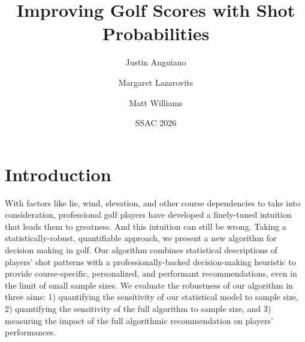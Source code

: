 \documentclass[11pt,a4paper]{article}
\title{Improving Golf Scores with Shot Probabilities}
\author[1]{Justin Anguiano}
\author[1]{Margaret Lazarovits}
\author[2]{Matt Williams}
\affil[1]{Department of Physics, University of Kansas}
\affil[2]{Noonan Caddie}
\date{SSAC 2026}
\begin{document}
\maketitle

\section{Introduction}
With factors like lie, wind, elevation, and other course dependencies to take into consideration, professional golf players have developed a finely-tuned intuition that leads them to greatness. And this intuition can still be wrong. Taking a statistically-robust, quantifiable approach, we present a new algorithm for decision making in golf. Our algorithm combines statistical descriptions of players’ shot patterns with a professionally-backed decision-making heuristic to provide course-specific, personalized, and performant recommendations, even in the limit of small sample sizes. We evaluate the robustness of our algorithm in three aims: 1) quantifying the sensitivity of our statistical model to sample size, 2) quantifying the sensitivity of the full algorithm to sample size, and 3) measuring the impact of the full algorithmic recommendation on players’ performances.
\end{document}
